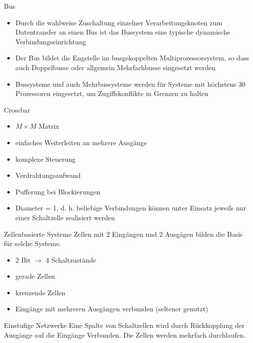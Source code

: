 \begin{defi}{Bus}
    \begin{itemize}
        \item Durch die wahlweise Zuschaltung einzelner Verarbeitungsknoten zum Datentransfer an einen Bus ist das Bussystem eine typische dynamische Verbindungseinrichtung
        \item Der Bus bildet die Engstelle im busgekoppelten Multiprozessorsystem,
              so dass auch Doppelbusse oder allgemein Mehrfachbusse eingesetzt werden
        \item Bussysteme und auch Mehrbussysteme werden für Systeme mit höchstens 30 Prozessoren eingesetzt,
              um Zugiffskonflikte in Grenzen zu halten
    \end{itemize}
\end{defi}

\begin{defi}{Crossbar}
    \begin{itemize}
        \item $M \times M$ Matrix
        \item einfaches Weiterleiten an mehrere Ausgänge
        \item komplexe Steuerung
        \item Verdrahtungsaufwand
        \item Pufferung bei Blockierungen
        \item Diameter = 1, d. h. beliebige Verbindungen können unter Einsatz jeweils nur einer Schaltzelle realisiert werden
    \end{itemize}
\end{defi}

\begin{defi}{Zellenbasierte Systeme}
    Zellen mit 2 Eingängen und 2 Ausgägen bilden die Basis für solche Systeme.
    \begin{itemize}
        \item 2 Bit $\to$ 4 Schaltzustände
        \item gerade Zellen
        \item kreuzende Zellen
        \item Eingänge mit mehreren Ausgängen verbunden (seltener genutzt)
    \end{itemize}
\end{defi}

\begin{defi}{Einstufige Netzwerke}
    Eine Spalte von Schaltzellen wird durch Rückkopplung der Ausgänge auf die Eingänge Verbunden. 
    Die Zellen werden mehrfach durchlaufen.
\end{defi}


